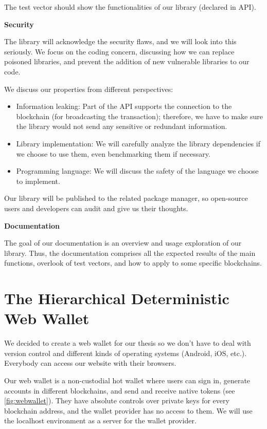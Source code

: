 The test vector should show the functionalities of our library (declared in API).

\bigskip
{\textbf{Security}}

The library will acknowledge the security flaws, and we will look into this seriously. We focus on the coding concern, discussing how we can replace poisoned libraries, and prevent the addition of new vulnerable libraries to our code.

We discuss our properties from different perspectives:

\begin{itemize}
    \item Information leaking: Part of the API supports the connection to the blockchain (for broadcasting the transaction); therefore, we have to make sure the library would not send any sensitive or redundant information.
    \item Library implementation: We will carefully analyze the library dependencies if we choose to use them, even benchmarking them if necessary.
    \item Programming language: We will discuss the safety of the language we choose to implement.
\end{itemize}

Our library will be published to the related package manager, so open-source users and developers can audit and give us their thoughts.

\bigskip
{\textbf{Documentation}}

The goal of our documentation is an overview and usage exploration of our library. Thus, the documentation comprises all the expected results of the main functions, overlook of test vectors, and how to apply to some specific blockchains.



\section{The Hierarchical Deterministic Web Wallet}
We decided to create a web wallet for our thesis so we don’t have to deal with version control and different kinds of operating systems (Android, iOS, etc.). Everybody can access our website with their browsers.

Our web wallet is a non-custodial hot wallet where users can sign in, generate accounts in different blockchains, and send and receive native tokens (see \autoref{fig:webwallet}). They have absolute controls over private keys for every blockchain address, and the wallet provider has no access to them. We will use the localhost environment as a server for the wallet provider.

